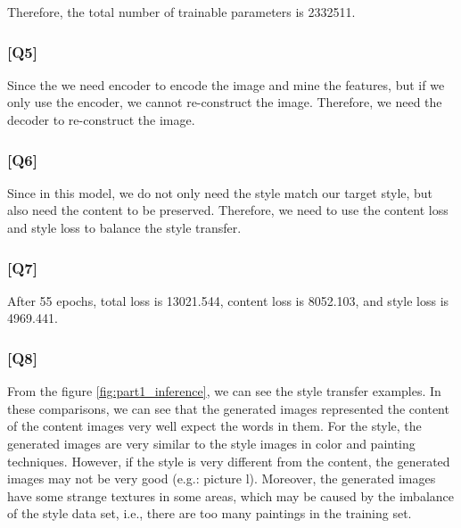 \documentclass{article}
\begin{document}
Therefore, the total number of trainable parameters is 2332511.

\subsubsection*{[Q5]}
Since the we need encoder to encode the image and mine the features, but if we only use the encoder, we cannot re-construct the image. 
Therefore, we need the decoder to re-construct the image.

\subsubsection*{[Q6]}
Since in this model, we do not only need the style match our target style, but also need the content to be preserved.
Therefore, we need to use the content loss and style loss to balance the style transfer.

\subsubsection*{[Q7]}

After 55 epochs, total loss is 13021.544, content loss is 8052.103, and style loss is 4969.441.

\subsubsection*{[Q8]}

From the figure \ref{fig:part1_inference}, we can see the style transfer examples.
In these comparisons, we can see that the generated images represented the content of the content images very well expect the words in them.
For the style, the generated images are very similar to the style images in color and painting techniques.
However, if the style is very different from the content, the generated images may not be very good (e.g.: picture l).
Moreover, the generated images have some strange textures in some areas, which may be caused by the imbalance of the style data set, i.e., there are too many paintings in the training set.
\end{document}
